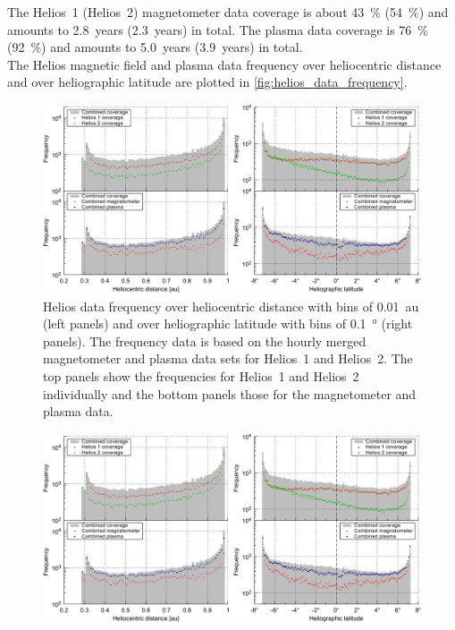 The Helios~1 (Helios~2) magnetometer data coverage is about \SI{43}{\%} (\SI{54}{\%}) and amounts to 2.8~years (2.3~years) in total. The plasma data coverage is \SI{76}{\%} (\SI{92}{\%}) and amounts to 5.0~years (3.9~years) in total.\\

The Helios magnetic field and plasma data frequency over heliocentric distance and over heliographic latitude are plotted in \autoref{fig:helios_data_frequency}.\\
\begin{figure}[htb]
	\centering
	\includegraphics[width=\textwidth]{figures_of_mine/gnuplots/helios_data_frequency.pdf}
	\caption[]
	{Helios data frequency over heliocentric distance with bins of \SI{0.01}{au} (left panels) and over heliographic latitude with bins of \SI{0.1}{\degree} (right panels). The frequency data is based on the hourly merged magnetometer and plasma data sets for Helios~1 and Helios~2. The top panels show the frequencies for Helios~1 and Helios~2 individually and the bottom panels those for the magnetometer and plasma data.}
	\label{fig:helios_data_frequency}
\end{figure}
\begin{figure}[htb]
	\includegraphics[width=\textwidth]{figures_of_mine/gnuplots/helios_data_frequency.pdf}
	\caption[Remove later...]{}
\end{figure}


